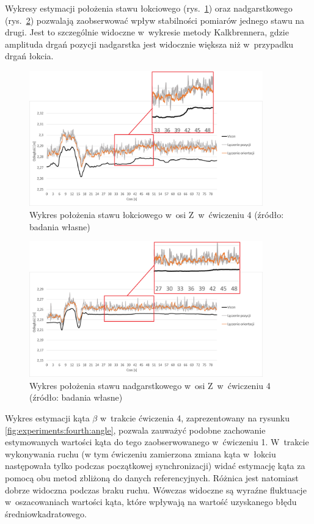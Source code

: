 																						
Wykresy estymacji położenia stawu łokciowego (rys.~\ref{fig:experiments:four:elbowZ}) oraz nadgarstkowego (rys.~\ref{fig:experiments:four:wristZ}) pozwalają zaobserwować wpływ stabilności pomiarów jednego stawu na drugi. Jest to szczególnie widoczne w~wykresie metody Kalkbrennera, gdzie amplituda drgań pozycji nadgarstka jest widocznie większa niż w~przypadku drgań łokcia. 
					
\begin{figure}[!htb]
	\centering	
		\includegraphics[width=0.9\textwidth]{images/400/3.png}		
		\caption[Wykres położenia stawu łokciowego w~osi Z~w~ćwiczeniu 4]{Wykres położenia stawu łokciowego w~osi Z~w~ćwiczeniu 4 (źródło: badania własne)}
		\label{fig:experiments:four:elbowZ}
\end{figure}
\begin{figure}[!htb]
	\centering
		\includegraphics[width=0.9\textwidth]{images/400/6.png}		
		\caption[Wykres położenia stawu nadgarstkowego w~osi Z~w~ćwiczeniu 4]{Wykres położenia stawu nadgarstkowego w~osi Z~w~ćwiczeniu 4 (źródło: badania własne)}	
		\label{fig:experiments:four:wristZ}
\end{figure}
		
Wykres estymacji kąta $\beta$ w~trakcie ćwiczenia 4, zaprezentowany na rysunku \ref{fig:experiments:fourth:angle}, pozwala zauważyć podobne zachowanie estymowanych wartości kąta do tego zaobserwowanego w~ćwiczeniu 1. W~trakcie wykonywania ruchu (w tym ćwiczeniu zamierzona zmiana kąta w~łokciu następowała tylko podczas początkowej synchronizacji) widać estymację kąta za pomocą obu metod zbliżoną do danych referencyjnych. Różnica jest natomiast dobrze widoczna podczas braku ruchu. Wówczas widoczne są wyraźne fluktuacje w~oszacowaniach wartości kąta, które wpływają na wartość uzyskanego błędu średniowkadratowego.
			
